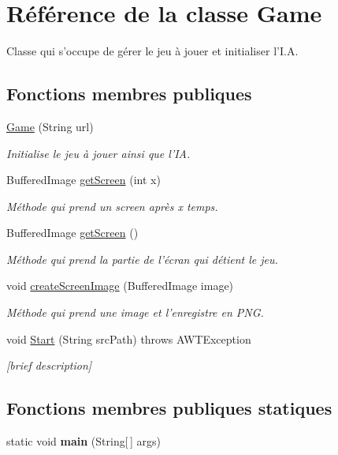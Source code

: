 \hypertarget{classGame}{\section{Référence de la classe Game}
\label{classGame}
}


Classe qui s'occupe de gérer le jeu à jouer et initialiser l'I.\+A.  


\subsection*{Fonctions membres publiques}
\begin{DoxyCompactItemize}
\item 
\hyperlink{classGame_a573ef60b3a39bf46b372d8b0934288c3}{Game} (String url)
\begin{DoxyCompactList}\small\item\em Initialise le jeu à jouer ainsi que l'I\+A. \end{DoxyCompactList}\item 
Buffered\+Image \hyperlink{classGame_ae01d0cebaa4cac6dba20772e5fc74eb3}{get\+Screen} (int x)
\begin{DoxyCompactList}\small\item\em Méthode qui prend un screen après x temps. \end{DoxyCompactList}\item 
Buffered\+Image \hyperlink{classGame_acbe5038734e186ae2b049fbace6a62e2}{get\+Screen} ()
\begin{DoxyCompactList}\small\item\em Méthode qui prend la partie de l'écran qui détient le jeu. \end{DoxyCompactList}\item 
void \hyperlink{classGame_a7f6dd2359a96d4f725a727729e63a738}{create\+Screen\+Image} (Buffered\+Image image)
\begin{DoxyCompactList}\small\item\em Méthode qui prend une image et l'enregistre en P\+N\+G. \end{DoxyCompactList}\item 
void \hyperlink{classGame_a0f1d4ce523a41d2c3e275fe7478d1baa}{Start} (String src\+Path)  throws A\+W\+T\+Exception
\begin{DoxyCompactList}\small\item\em \mbox{[}brief description\mbox{]} \end{DoxyCompactList}\end{DoxyCompactItemize}
\subsection*{Fonctions membres publiques statiques}
\begin{DoxyCompactItemize}
\item 
\hypertarget{classGame_ae52595a27ac1b327b05db2129ad81fca}{static void {\bfseries main} (String\mbox{[}$\,$\mbox{]} args)}\label{classGame_ae52595a27ac1b327b05db2129ad81fca}

\end{DoxyCompactItemize}


